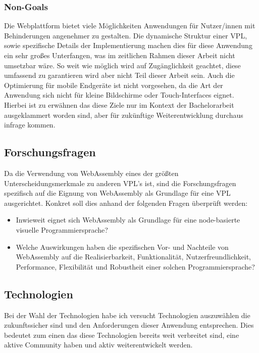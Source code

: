 \documentclass[ngerman]{article}
\begin{document}
\subsubsection{Non-Goals}
Die Webplattform bietet viele Möglichkeiten Anwendungen für Nutzer/innen mit Behinderungen angenehmer zu gestalten. 
Die dynamische Struktur einer VPL, sowie spezifische Details der Implementierung machen dies für diese Anwendung ein sehr großes Unterfangen, was im zeitlichen Rahmen dieser Arbeit nicht umsetzbar wäre. So weit wie möglich wird auf Zugänglichkeit geachtet, diese umfassend zu garantieren wird aber nicht Teil dieser Arbeit sein.
\br
Auch die Optimierung für mobile Endgeräte ist nicht vorgesehen, da die Art der Anwendung sich nicht für kleine Bildschirme oder Touch-Interfaces eignet.
\br
Hierbei ist zu erwähnen das diese Ziele nur im Kontext der Bachelorarbeit ausgeklammert worden sind, aber für zukünftige Weiterentwicklung durchaus infrage kommen.

\subsection{Forschungsfragen}
Da die Verwendung von WebAssembly eines der größten Unterscheidungsmerkmale zu anderen VPL's ist, sind die Forschungsfragen spezifisch auf die Eignung von WebAssembly als Grundlage für eine VPL ausgerichtet. Konkret soll dies anhand der folgenden Fragen überprüft werden:
\begin{itemize}
  \item Inwieweit eignet sich WebAssembly als Grundlage für eine node-basierte visuelle Programmiersprache?  
  \item Welche Auswirkungen haben die spezifischen Vor- und Nachteile von WebAssembly auf die Realisierbarkeit, Funktionalität, Nutzerfreundlichkeit, Performance, Flexibilität und Robustheit einer solchen Programmiersprache?
\end{itemize}

\pagebreak

\subsection{Technologien}

Bei der Wahl der Technologien habe ich versucht Technologien auszuwählen die zukunftssicher sind und den Anforderungen dieser Anwendung entsprechen. Dies bedeutet zum einen das diese Technologien bereits weit verbreitet sind, eine aktive Community haben und aktiv weiterentwickelt werden.
\end{document}
